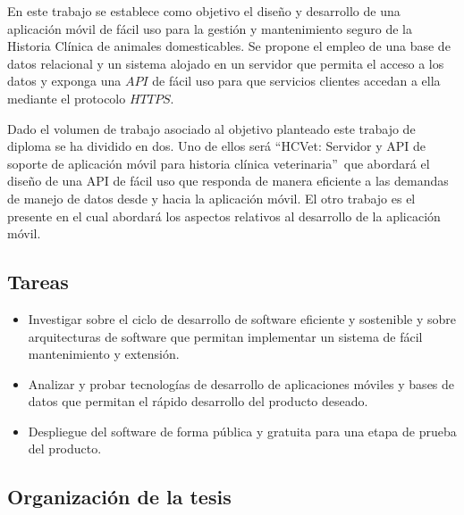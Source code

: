 En este trabajo se establece como objetivo el diseño y desarrollo de una aplicación móvil de fácil uso para la gestión y mantenimiento seguro de la Historia Clínica de animales domesticables. Se propone el empleo de una base de datos relacional y un sistema alojado en un servidor que permita el acceso a los datos y exponga una $API$ de fácil uso para que servicios clientes accedan a ella mediante el protocolo $HTTPS$.

Dado el volumen de trabajo asociado al objetivo planteado este trabajo de diploma se ha dividido en dos. Uno de ellos será \textquotedblleft HCVet: Servidor y API de soporte de aplicación móvil para historia clínica veterinaria\textquotedblright\ que abordará el diseño de una API de fácil uso que responda de manera eficiente a las demandas de manejo de datos desde y hacia la aplicación móvil. El otro trabajo es el presente en el cual abordará los aspectos relativos al desarrollo de la aplicación móvil.

\subsection*{Tareas}

\begin{itemize}
\item Investigar sobre el ciclo de desarrollo de software eficiente y sostenible y sobre arquitecturas de software que permitan implementar un sistema de fácil mantenimiento y extensión.
\item Analizar y probar tecnologías de desarrollo de aplicaciones móviles y bases de datos que permitan el rápido desarrollo del producto deseado.
\item Despliegue del software de forma pública y gratuita para una etapa de prueba del producto.
\end{itemize}

\subsection*{Organizaci\'on de la tesis}

